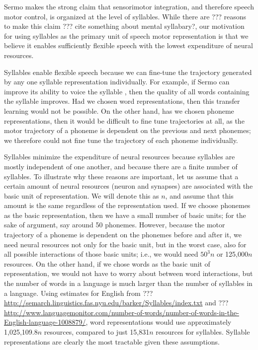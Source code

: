 Sermo makes the strong claim
that sensorimotor integration,
and therefore speech motor control,
is organized at the level of syllables.
While there are ??? reasons
to make this claim
??? cite something about mental syllabary?,
our motivation for using syllables
as the primary unit
of speech motor representation
is that we believe
it enables sufficiently flexible speech
with the lowest expenditure of neural resources.

Syllables enable flexible speech
because we can fine-tune the
trajectory generated by any
one syllable representation individually.
For example,
if Sermo can improve its ability
to voice the syllable \ipa{[bA]},
then the quality of all words
containing the syllable \ipa{[bA]}
improves.
Had we chosen word representations,
then this transfer learning
would not be possible.
On the other hand,
has we chosen phoneme representations,
then it would be difficult
to fine tune trajectories at all,
as the motor trajectory of a phoneme
is dependent on the
previous and next phonemes;
we therefore could not fine tune
the trajectory of each phoneme individually.

Syllables minimize the expenditure of neural resources
because syllables are mostly independent of one another,
and because there are a finite number of syllables.
To illustrate why these reasons are important,
let us assume that a certain amount of
neural resources (neuron and synapses)
are associated with the basic unit of representation.
We will denote this as $n$,
and assume that this amount is the same
regardless of the representation used.
If we choose phonemes as the basic representation,
then we have a small number of basic units;
for the sake of argument,
say around 50 phonemes.
However, because the motor trajectory
of a phoneme is dependent on the
phonemes before and after it,
we need neural resources not only for
the basic unit, but in the worst case,
also for all possible
interactions of those basic units;
i.e., we would need $50^3n$ or 125,000$n$ resources.
On the other hand, if we chose
words as the basic unit of representation,
we would not have to worry about
between word interactions,
but the number of words in a language
is much larger than the number of syllables
in a language.
Using estimates for English
from ??? \url{http://semarch.linguistics.fas.nyu.edu/barker/Syllables/index.txt}
and ??? \url{http://www.languagemonitor.com/number-of-words/number-of-words-in-the-English-language-1008879/},
word representations would use approximately
1,025,109.8$n$ resources,
compared to just 15,831$n$ resources for syllables.
Syllable representations are clearly the most tractable
given these assumptions.

